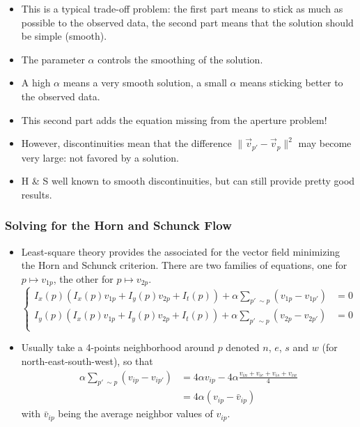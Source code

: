 \documentclass[10pt]{beamer}
\newcommand{\myemph}[1]{{\color{blue}{#1}}}
\begin{document}
\begin{frame}
  \begin{itemize}
  \item This is a typical trade-off problem: the first part means to stick as much as
    possible to the observed data, the second part means that the solution should be
    simple (smooth). 
  \item The parameter $\alpha$ controls the smoothing of the solution.
  \item A high $\alpha$ means a very smooth solution, a small $\alpha$ means sticking better to the observed data.
  \item This second part adds the equation missing from the aperture problem!
  \item However, discontinuities mean that the difference $\|\vec{v}_{p'} - \vec{v}_p\|^2$ may become very large: not favored by a solution.
  \item H \& S well known to smooth discontinuities, but can still provide pretty good results.
  \end{itemize}
\end{frame}

\begin{frame}
  \frametitle{Solving for the Horn and Schunck Flow}
  \begin{itemize}
    
  \item Least-square theory provides the associated \myemph{normal equations} for the
    vector field minimizing the Horn and Schunck criterion. There are two families of \myemph{coupled} equations, one for $p\mapsto v_{1p}$, the other for
    $p\mapsto v_{2p}$.
    $$
    \begin{cases}
      I_x(p)\left(I_x(p)v_{1p} + I_y(p)v_{2p} + I_t(p)\right) + \alpha\sum_{p'~\sim p}\left(v_{1p}-v_{1p'}\right) &= 0\\
      I_y(p)\left(I_x(p)v_{1p} + I_y(p)v_{2p} + I_t(p)\right) + \alpha\sum_{p'~\sim p}\left(v_{2p}-v_{2p'}\right) &= 0\\
    \end{cases}
    $$
    \item Usually take a 4-points neighborhood around $p$ denoted $n$, $e$, $s$ and $w$ (for north-east-south-west), so that 
      \begin{align*}
        \alpha\sum_{p'~\sim p}\left(v_{ip}-v_{ip'}\right) &= 4\alpha v_{ip} -
        4\alpha\frac{v_{in}+ v_{ie} + v_{is} + v_{iw}}{4}\\
        &= 4\alpha \left(v_{ip} - \bar{v}_{ip}\right)
    \end{align*}
    with $\bar{v}_{ip}$ being the average neighbor values of $v_{ip}$. 
  \end{itemize}
\end{frame}
\end{document}
